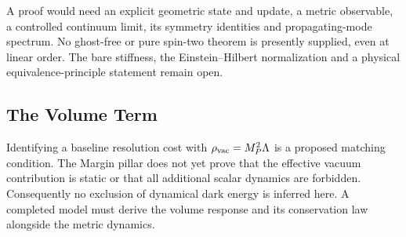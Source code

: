 A proof would need an explicit geometric state and update, a metric observable, a controlled continuum limit, its symmetry identities and propagating-mode spectrum. No ghost-free or pure spin-two theorem is presently supplied, even at linear order. The bare stiffness, the Einstein--Hilbert normalization and a physical equivalence-principle statement remain open.

\subsection{The Volume Term}
Identifying a baseline resolution cost with $\rho_{\rm vac}=M_P^2\Lambda$ is a proposed matching condition. The Margin pillar does not yet prove that the effective vacuum contribution is static or that all additional scalar dynamics are forbidden. Consequently no exclusion of dynamical dark energy is inferred here. A completed model must derive the volume response and its conservation law alongside the metric dynamics.
